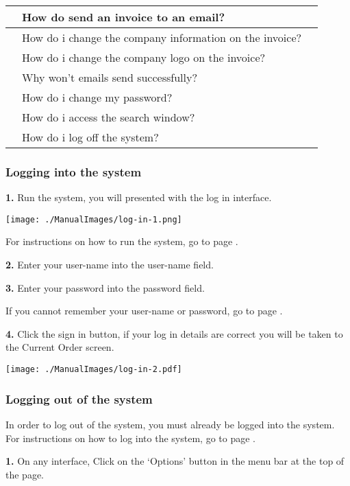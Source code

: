 \begin{center}
\begin{longtable}{|p{3cm}|p{6cm}|p{3cm}|}
	&How do send an invoice to an email?& \\ \hline
	&How do i change the company information on the invoice? & \\ \hline
	&How do i change the company logo on the invoice?& \\ \hline
	&Why won't emails send successfully?& \\ \hline
	&How do i change my password?& \\ \hline
	&How do i access the search window?& \\ \hline
	&How do i log off the system?& \\ \hline
	\end{longtable}
\end{center}

\pagebreak

\subsubsection{Logging into the system}
\label{fig:Logging into the system}

\textbf{1.} Run the system, you will presented with the log in interface.
 
\texttt{[image: ./ManualImages/log-in-1.png]}
  
For instructions on how to run the system, go to page .

\textbf{2.} Enter your user-name into the user-name field.

\textbf{3.} Enter your password into the password field.

If you cannot remember your user-name or password, go to page .

\textbf{4.} Click the sign in button, if your log in details are correct you will be taken to the Current Order screen.

\texttt{[image: ./ManualImages/log-in-2.pdf]}

\pagebreak
\subsubsection{Logging out of the system}
\label{fig:Logging out of the system}

In order to log out of the system, you must already be logged into the system. For instructions on how to log into the system, go to page \pageref{fig:Logging into the system}.

\textbf{1.}  On any interface, Click on the `Options' button in the menu bar at the top of the page.

